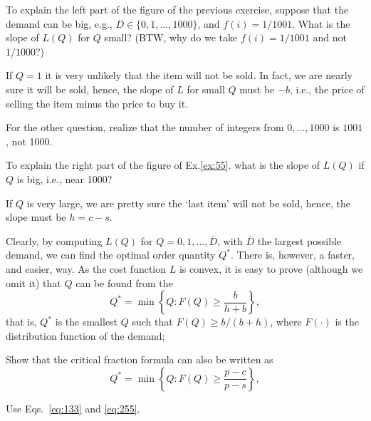 \begin{exercise}[Continuation]
To explain the left part of the figure of the previous exercise, suppose that the demand can be big, e.g., $D\in\{0,1,\ldots, 1000\}$, and $f(i) = 1/1001$. What is the slope of $L(Q)$ for $Q$ small? (BTW, why do we take $f(i)=1/1001$ and not $1/1000$?) 
\begin{solution}
  If $Q=1$ it is very unlikely that the item will not be sold. In fact, we are nearly sure it will be sold, hence, the slope of $L$ for small $Q$ must be $-b$, i.e., the price of selling the item minus the price to buy it.

For the other question, realize that the number of integers from $0, \ldots, 1000$ is $1001$, not 1000.
\end{solution}
\end{exercise}
 
\begin{exercise}[Continuation] To explain the right  part of the figure of Ex.\ref{ex:55}.
what is the slope of $L(Q)$ if $Q$ is big, i.e., near 1000? 
\begin{solution}
If $Q$ is very large, we are pretty sure the `last item' will not be sold, hence, the slope must be $h=c-s$. 
\end{solution}
\end{exercise}

Clearly, by computing $L(Q)$ for $Q=0, 1, \ldots, \bar D$, with $\bar D$ the largest possible demand, we can find the optimal order quantity $Q^*$. There is, however, a faster, and easier, way. As the cost function $L$ is convex, it is easy to prove (although we omit it) that 
$Q$ can be found from the 
\begin{equation}\label{eq:255}
Q^* = \min\left\{Q : F(Q)\geq \frac{b}{h+b}\right\},
\end{equation}
that is, $Q^*$ is the smallest $Q$ such that $F(Q) \geq b/(b+h)$, where $F(\cdot)$ is the distribution function of the demand; 

\begin{exercise}
Show that the critical fraction formula can also be written as
\begin{equation*}
Q^* = \min\left\{Q : F(Q)\geq \frac{p-c}{p-s}\right\},
\end{equation*}
\begin{solution}
Use Eqs.~\eqref{eq:133} and \eqref{eq:255}.
\end{solution}
\end{exercise}

